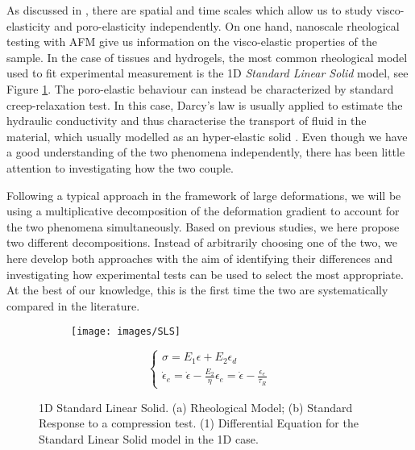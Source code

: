 As discussed in \cite{viscoporo}, there are spatial and time scales which allow us to study visco-elasticity and poro-elasticity independently. On one hand, nanoscale rheological testing with AFM give us information on the visco-elastic properties of the sample. In the case of tissues and hydrogels, the most common rheological model used to fit experimental measurement is the 1D \textit{Standard Linear Solid} model\cite{Article1,viscoporo}, see Figure \ref{SLS}. The poro-elastic behaviour can instead be characterized by standard creep-relaxation test. In this case, Darcy's law is usually applied to estimate the hydraulic conductivity and thus characterise the transport of fluid in the material, which usually modelled as an hyper-elastic solid \cite{viscoporo,Netti}. Even though we have a good understanding of the two phenomena independently, there has been little attention to investigating how the two couple. 

Following a typical approach in the framework of large deformations, we will be using a multiplicative decomposition of the deformation gradient to account for the two phenomena simultaneously. 
Based on previous studies, we here propose two different decompositions. Instead of arbitrarily choosing one of the two, we here develop both approaches with the aim of identifying their differences and investigating how experimental tests can be used to select the most appropriate. At the best of our knowledge, this is the first time the two are systematically compared in the literature.


\begin{figure}
	\begin{subfigure}{0.45\textwidth}
		\centering 
		\def\svgwidth{1.3\linewidth}
		
		\caption{}
	\end{subfigure}
	\begin{subfigure}{0.45\textwidth}
	\centering
	\texttt{[image: images/SLS]}\qquad 
	\caption{}
	\end{subfigure}

\vspace{5mm}
\begin{equation}
\begin{cases}
\sigma = E_1\epsilon+E_2\epsilon_d\\
\dot{\epsilon}_e = \dot{\epsilon} -\frac{E_2}{\eta} \epsilon_e = \dot{\epsilon} - \frac{\epsilon_e}{\tau_R}
\end{cases}
\end{equation}
\vspace{3mm}
\caption{1D Standard Linear Solid. (a) Rheological Model; (b) Standard Response to a compression test. (1) Differential Equation for the Standard Linear Solid model in the 1D case.}
\label{SLS}
\end{figure}

